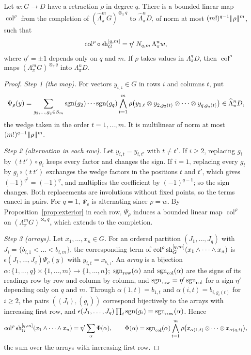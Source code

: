 \begin{proposition}\label{dgr:prop:r-column}
Let $w\colon G\to D$ have a retraction $\rho$ in degree $q$. There is a bounded linear map $\operatorname{col}^\rho$ from
the completion of $(\widehat\Lambda^m_\pi G)^{\otimes_\pi q}$ to $\widehat\Lambda^n_\pi D$, of norm at most
$(m!)^{q-1}\lVert \rho\rVert^m$, such that
\[
 \operatorname{col}^\rho\circ\operatorname{sh}^{[q,m]}_G=\eta'\,N_{q,m}\,\Lambda^n_\pi w,
\]
where $\eta'=\pm1$ depends only on $q$ and $m$. If $\rho$ takes values in $\Lambda^q_\pi D$, then
$\operatorname{col}^\rho$ maps $(\Lambda^m_\pi G)^{\otimes_\pi q}$ into $\Lambda^n_\pi D$.
\end{proposition}

\begin{proof}
\emph{Step 1 (the map).} For vectors $y_{i,t}\in G$ in rows $i$ and columns $t$, put
\[
 \Psi_\rho(y)=\sum_{g_2,\dots,g_q\in S_m}\operatorname{sgn}(g_2)\cdots\operatorname{sgn}(g_q)\bigwedge_{t=1}^m
 \rho\bigl(y_{1,t}\otimes y_{2,g_2(t)}\otimes\dots\otimes y_{q,g_q(t)}\bigr)\in\widehat\Lambda^n_\pi D,
\]
the wedge taken in the order $t=1,\dots,m$. It is multilinear of norm at most $(m!)^{q-1}\lVert \rho\rVert^m$.

\emph{Step 2 (alternation in each row).} Let $y_{i,t}=y_{i,t'}$ with $t\ne t'$. If $i\ge2$, replacing $g_i$ by
$(t\ t')\circ g_i$ keeps every factor and changes the sign. If $i=1$, replacing every $g_l$ by $g_l\circ(t\ t')$ exchanges
the wedge factors in the positions $t$ and $t'$, which gives $(-1)^{q^2}=(-1)^q$, and multiplies the coefficient by
$(-1)^{q-1}$; so the sign changes. Both replacements are involutions without fixed points, so the terms cancel in pairs.
For $q=1$, $\Psi_\rho$ is alternating since $\rho=w$. By Proposition~\ref{prop:exterior} in each row, $\Psi_\rho$ induces
a bounded linear map $\operatorname{col}^\rho$ on $(\Lambda^m_\pi G)^{\otimes_\pi q}$, which extends to the completion.

\emph{Step 3 (arrays).} Let $x_1,\dots,x_n\in G$. For an ordered partition $(J_1,\dots,J_q)$ with
$J_i=\{b_{i,1}<\dots<b_{i,m}\}$, the corresponding term of $\operatorname{col}^\rho\operatorname{sh}^{[q,m]}_G(x_1\wedge\dots\wedge x_n)$
is $\epsilon(J_1,\dots,J_q)\Psi_\rho(y)$ with $y_{i,t}=x_{b_{i,t}}$. An \emph{array} is a bijection
$\alpha\colon\{1,\dots,q\}\times\{1,\dots,m\}\to\{1,\dots,n\}$; $\operatorname{sgn}_{\mathrm{row}}(\alpha)$ and
$\operatorname{sgn}_{\mathrm{col}}(\alpha)$ are the signs of its readings row by row and column by column, and
$\operatorname{sgn}_{\mathrm{row}}=\eta'\operatorname{sgn}_{\mathrm{col}}$ for a sign $\eta'$ depending only on $q$ and $m$. Through
$\alpha(1,t)=b_{1,t}$ and $\alpha(i,t)=b_{i,g_i(t)}$ for $i\ge2$, the pairs $((J_i),(g_i))$ correspond bijectively to the
arrays with increasing first row, and $\epsilon(J_1,\dots,J_q)\prod_i\operatorname{sgn}(g_i)=\operatorname{sgn}_{\mathrm{row}}(\alpha)$. Hence
\[
 \operatorname{col}^\rho\operatorname{sh}^{[q,m]}_G(x_1\wedge\dots\wedge x_n)=\eta'\sum_\alpha\Phi(\alpha),\qquad
 \Phi(\alpha)=\operatorname{sgn}_{\mathrm{col}}(\alpha)\bigwedge_{t=1}^m\rho\bigl(x_{\alpha(1,t)}\otimes\dots\otimes x_{\alpha(q,t)}\bigr),
\]
the sum over the arrays with increasing first row.


\end{proof}
